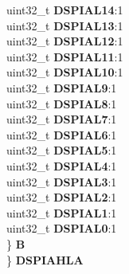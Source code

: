 \begin{DoxyCompactItemize}
\begin{tabbing}
\>\>uint32\_t {\bfseries DSPIAL14}:1\\
\>\>uint32\_t {\bfseries DSPIAL13}:1\\
\>\>uint32\_t {\bfseries DSPIAL12}:1\\
\>\>uint32\_t {\bfseries DSPIAL11}:1\\
\>\>uint32\_t {\bfseries DSPIAL10}:1\\
\>\>uint32\_t {\bfseries DSPIAL9}:1\\
\>\>uint32\_t {\bfseries DSPIAL8}:1\\
\>\>uint32\_t {\bfseries DSPIAL7}:1\\
\>\>uint32\_t {\bfseries DSPIAL6}:1\\
\>\>uint32\_t {\bfseries DSPIAL5}:1\\
\>\>uint32\_t {\bfseries DSPIAL4}:1\\
\>\>uint32\_t {\bfseries DSPIAL3}:1\\
\>\>uint32\_t {\bfseries DSPIAL2}:1\\
\>\>uint32\_t {\bfseries DSPIAL1}:1\\
\>\>uint32\_t {\bfseries DSPIAL0}:1\\
\>\} {\bfseries B}\\
\} {\bfseries DSPIAHLA}\\


\end{tabbing}
\end{DoxyCompactItemize}
